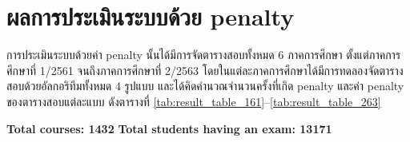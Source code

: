 \section{ผลการประเมินระบบด้วย penalty}
การประเมินระบบด้วยค่า penalty นั้นได้มีการจัดตารางสอบทั้งหมด 6 ภาคการศึกษา ตั้งแต่ภาคการศึกษาที่ 1/2561 จนถึงภาคการศึกษาที่ 2/2563
โดยในแต่ละภาคการศึกษาได้มีการทดลองจัดตารางสอบด้วยอัลกอริทึมทั้งหมด 4 รูปแบบ และได้คิดคำนวณจำนวนครั้งที่เกิด penalty และค่า penalty ของตารางสอบแต่ละแบบ ดังตารางที่ \ref{tab:result_table_161}--\ref{tab:result_table_263}
%
\begin{table}[]
    \centering
    \textbf{Total courses: 1432} \quad \quad \textbf{Total students having an exam: 13171}
\end{table}
